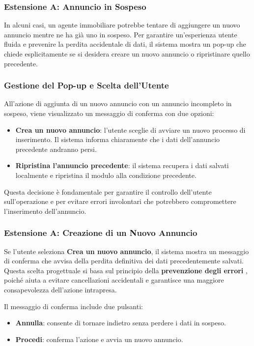 \newpage
\clearpage
\subsubsection{Estensione A: Annuncio in Sospeso}

In alcuni casi, un agente immobiliare potrebbe tentare di aggiungere un nuovo annuncio mentre ne ha già uno in sospeso. Per garantire un’esperienza utente fluida e prevenire la perdita accidentale di dati, il sistema mostra un pop-up che chiede esplicitamente se si desidera creare un nuovo annuncio o ripristinare quello precedente.

\subsubsection{Gestione del Pop-up e Scelta dell’Utente}
All’azione di aggiunta di un nuovo annuncio con un annuncio incompleto in sospeso, viene visualizzato un messaggio di conferma con due opzioni:
\begin{itemize}
    \item \textbf{Crea un nuovo annuncio}: l’utente sceglie di avviare un nuovo processo di inserimento. Il sistema informa chiaramente che i dati dell’annuncio precedente andranno persi.
    \item \textbf{Ripristina l’annuncio precedente}: il sistema recupera i dati salvati localmente e ripristina il modulo alla condizione precedente.
\end{itemize}

Questa decisione è fondamentale per garantire il controllo dell’utente sull’operazione e per evitare errori involontari che potrebbero compromettere l’inserimento dell’annuncio.

\subsubsection{Estensione A: Creazione di un Nuovo Annuncio}
Se l’utente seleziona \textbf{Crea un nuovo annuncio}, il sistema mostra un messaggio di conferma che avvisa della perdita definitiva dei dati precedentemente salvati. Questa scelta progettuale si basa sul principio della \textbf{prevenzione degli errori} \cite{nielsen1995}, poiché aiuta a evitare cancellazioni accidentali e garantisce una maggiore consapevolezza dell’azione intrapresa.

Il messaggio di conferma include due pulsanti:
\begin{itemize}
    \item \textbf{Annulla}: consente di tornare indietro senza perdere i dati in sospeso.
    \item \textbf{Procedi}: conferma l’azione e avvia un nuovo annuncio.
\end{itemize}


